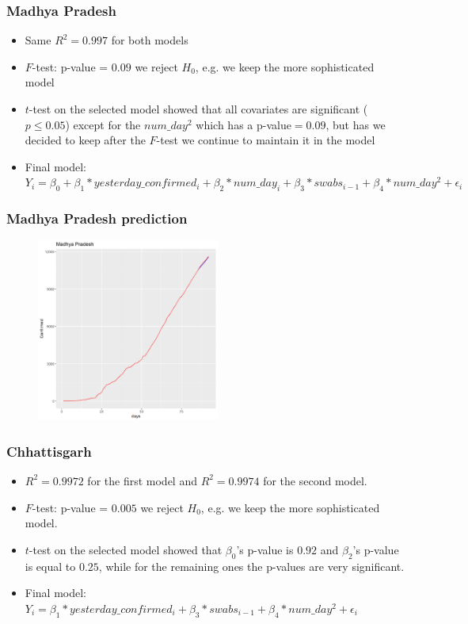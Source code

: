 \documentclass{beamer}
\begin{document}
\begin{frame}
\frametitle{Madhya Pradesh}
\begin{itemize}
	\item Same $R^2 = 0.997$ for both models
	\item $F$-test: p-value = $0.09$ we reject $H_0$, e.g. we keep the more sophisticated model
	\item $t$-test on the selected model showed that all covariates are significant ($p \leq 0.05$) except for the $num\_day^2$ which has a p-value$=0.09$, but has we decided to keep after the $F$-test we continue to maintain it in the model
	\item Final model: $Y_i = \beta_0 + \beta_1*yesterday\_confirmed_i + \beta_2*num\_day_i + \beta_3*swabs_{i-1} + \beta_4*num\_day^2 + \epsilon_i $
	
\end{itemize}
\end{frame}

\begin{frame}
\frametitle{Madhya Pradesh prediction}
\begin{figure}
	\includegraphics[width=\linewidth, height=6cm]{../plots/pred/normal/Madhya Pradesh_predictions_sqrd.png}
\end{figure}
\end{frame}


\begin{frame}
\frametitle{Chhattisgarh}
\begin{itemize}
	\item $R^2 = 0.9972$ for the first model and $R^2 = 0.9974$ for the second model. 
	\item $F$-test: p-value = $0.005$ we reject $H_0$, e.g. we keep the more sophisticated model.
	\item $t$-test on the selected model showed that $\beta_0$'s p-value is $0.92$ and $\beta_2$'s p-value is equal to $0.25$, while for the remaining ones the p-values are very significant.
	\item Final model: $Y_i = \beta_1*yesterday\_confirmed_i + \beta_3*swabs_{i-1} + \beta_4*num\_day^2 + \epsilon_i $
	
\end{itemize}
\end{frame}
\end{document}
